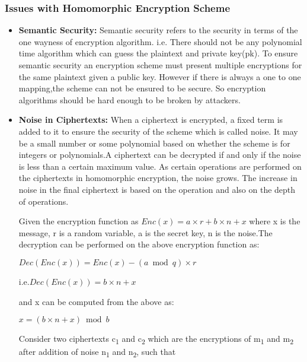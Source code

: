 \subsubsection{Issues with Homomorphic Encryption Scheme} \label{limitations}
\begin{itemize}
\item
\textbf{Semantic Security:} Semantic security refers to the security in terms of the one wayness of encryption algorithm. i.e. There should not be any polynomial time algorithm which can guess the plaintext and private key(pk). To ensure semantic security an encryption scheme must present multiple encryptions for the same plaintext given a public key. However if there is always a one to one mapping,the scheme can not be ensured to be secure. So encryption algorithms should be hard enough to be broken by attackers. 
\item 
\textbf{Noise in Ciphertexts:} When a ciphertext is encrypted, a fixed term is added to it to ensure the security of the scheme which is called noise. It may be a small number or some polynomial based on whether the scheme is for integers or polynomials.A ciphertext can be decrypted if and only if the noise is less than a certain maximum value. As certain operations are performed on the ciphertexts in homomorphic encryption, the noise grows. The increase in noise in the final ciphertext is based on the operation and also on the depth of operations.

 \noindent Given the encryption function as $Enc(x)=a\times r+b\times n+x$ where x is the message, r is a random variable, a is the secret key, n is the noise.The decryption can be performed on the above encryption function as: 

 \noindent\hspace{3cm} $Dec(Enc(x))=Enc(x)-(a\bmod q)\times r$
 
 \noindent i.e.\hspace{2.7cm}$Dec(Enc(x))= b\times n+x$
 
 \noindent and x can be computed from the above as:
 
 \noindent\hspace{3cm} $x=(b\times n+x)\bmod b$

\vspace{0.25cm}
 \noindent Consider two ciphertexts c\textsubscript{1} and c\textsubscript{2} which are the encryptions of m\textsubscript{1} and m\textsubscript{2} after addition of noise n\textsubscript{1} and n\textsubscript{2}, such that
 

\end{itemize}
